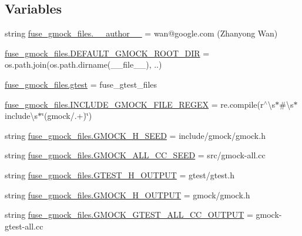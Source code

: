 \subsection*{Variables}
\begin{DoxyCompactItemize}
\item 
string \mbox{\hyperlink{namespacefuse__gmock__files_abbec91475e2948cd4528a04cc3b19d18}{fuse\+\_\+gmock\+\_\+files.\+\_\+\+\_\+author\+\_\+\+\_\+}} = \textquotesingle{}wan@google.\+com (Zhanyong Wan)\textquotesingle{}
\item 
\mbox{\hyperlink{namespacefuse__gmock__files_a900b64b34e20c7430b72252192a3c7ed}{fuse\+\_\+gmock\+\_\+files.\+D\+E\+F\+A\+U\+L\+T\+\_\+\+G\+M\+O\+C\+K\+\_\+\+R\+O\+O\+T\+\_\+\+D\+IR}} = os.\+path.\+join(os.\+path.\+dirname(\+\_\+\+\_\+file\+\_\+\+\_\+), \textquotesingle{}..\textquotesingle{})
\item 
\mbox{\hyperlink{namespacefuse__gmock__files_a3fb36dbe8d361f9ecc54e1aa4b94b068}{fuse\+\_\+gmock\+\_\+files.\+gtest}} = fuse\+\_\+gtest\+\_\+files
\item 
\mbox{\hyperlink{namespacefuse__gmock__files_aeb4457451f878d6bc8a42f7ff3e5f6cf}{fuse\+\_\+gmock\+\_\+files.\+I\+N\+C\+L\+U\+D\+E\+\_\+\+G\+M\+O\+C\+K\+\_\+\+F\+I\+L\+E\+\_\+\+R\+E\+G\+EX}} = re.\+compile(r\textquotesingle{}$^\wedge$\textbackslash{}s$\ast$\#\textbackslash{}s$\ast$include\textbackslash{}s$\ast$\char`\"{}(gmock/.+)\char`\"{}\textquotesingle{})
\item 
string \mbox{\hyperlink{namespacefuse__gmock__files_aa31b816a9048fb3fa9d482eeac69c139}{fuse\+\_\+gmock\+\_\+files.\+G\+M\+O\+C\+K\+\_\+\+H\+\_\+\+S\+E\+ED}} = \textquotesingle{}include/gmock/gmock.\+h\textquotesingle{}
\item 
string \mbox{\hyperlink{namespacefuse__gmock__files_a518e1f3cc3f184747e6ed3f2d0233c99}{fuse\+\_\+gmock\+\_\+files.\+G\+M\+O\+C\+K\+\_\+\+A\+L\+L\+\_\+\+C\+C\+\_\+\+S\+E\+ED}} = \textquotesingle{}src/gmock-\/all.\+cc\textquotesingle{}
\item 
string \mbox{\hyperlink{namespacefuse__gmock__files_a385c31d8542b0a2e4b7f46cb2a32d7da}{fuse\+\_\+gmock\+\_\+files.\+G\+T\+E\+S\+T\+\_\+\+H\+\_\+\+O\+U\+T\+P\+UT}} = \textquotesingle{}gtest/gtest.\+h\textquotesingle{}
\item 
string \mbox{\hyperlink{namespacefuse__gmock__files_aba0664abeb60f34cfdf59e8475a465d0}{fuse\+\_\+gmock\+\_\+files.\+G\+M\+O\+C\+K\+\_\+\+H\+\_\+\+O\+U\+T\+P\+UT}} = \textquotesingle{}gmock/gmock.\+h\textquotesingle{}
\item 
string \mbox{\hyperlink{namespacefuse__gmock__files_a9759f3f6c404e3292c26c9317792e846}{fuse\+\_\+gmock\+\_\+files.\+G\+M\+O\+C\+K\+\_\+\+G\+T\+E\+S\+T\+\_\+\+A\+L\+L\+\_\+\+C\+C\+\_\+\+O\+U\+T\+P\+UT}} = \textquotesingle{}gmock-\/gtest-\/all.\+cc\textquotesingle{}
\end{DoxyCompactItemize}

